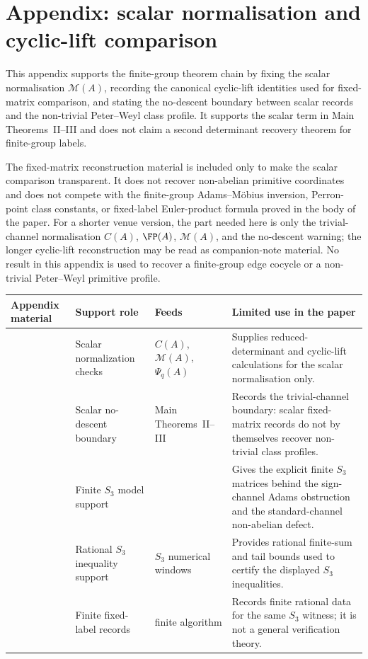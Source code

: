 \section{Appendix: scalar normalisation and cyclic-lift comparison}
\label{app:cyclic-lift-comparison}

This appendix supports the finite-group theorem chain by fixing the scalar
normalisation \(\mathcal M(A)\), recording the canonical cyclic-lift identities
used for fixed-matrix comparison, and stating the no-descent boundary between
scalar records and the non-trivial Peter--Weyl class profile.  It supports the
scalar term in Main Theorems~II--III and does not claim a second determinant
recovery theorem for finite-group labels.

The fixed-matrix reconstruction material is included only to make the scalar
comparison transparent.  It does not recover non-abelian primitive coordinates
and does not compete with the finite-group Adams--M\"obius inversion,
Perron-point class constants, or fixed-label Euler-product formula proved in
the body of the paper.  For a shorter venue version, the part needed here is
only the trivial-channel normalisation \(C(A)\), \(\FP(A)\), \(\mathcal M(A)\),
and the no-descent warning; the longer cyclic-lift reconstruction may be read
as companion-note material.  No result in this appendix is used to recover a
finite-group edge cocycle or a non-trivial Peter--Weyl primitive profile.
\begin{center}
\begin{tabular}{@{}L{0.24\textwidth}L{0.21\textwidth}L{0.19\textwidth}L{0.26\textwidth}@{}}
\toprule
Appendix material & Support role & Feeds & Limited use in the paper \\
\midrule
{}
& Scalar normalization checks
& \(C(A)\), \(\mathcal M(A)\), \(\Psi_q(A)\)
& Supplies reduced-determinant and cyclic-lift calculations for the scalar
normalisation only. \\
& Scalar no-descent boundary
& Main Theorems~II--III
& Records the trivial-channel boundary: scalar fixed-matrix records do not by
themselves recover non-trivial class profiles. \\
& Finite \(S_3\) model support
& 
& Gives the explicit finite \(S_3\) matrices behind the sign-channel
Adams obstruction and the standard-channel non-abelian defect. \\
& Rational \(S_3\) inequality support
& \(S_3\) numerical windows
& Provides rational finite-sum and tail bounds used to certify the
displayed \(S_3\) inequalities. \\
& Finite fixed-label records
& finite algorithm
& Records finite rational data for the same \(S_3\) witness; it is not a
general verification theory. \\
\bottomrule
\end{tabular}
\end{center}

